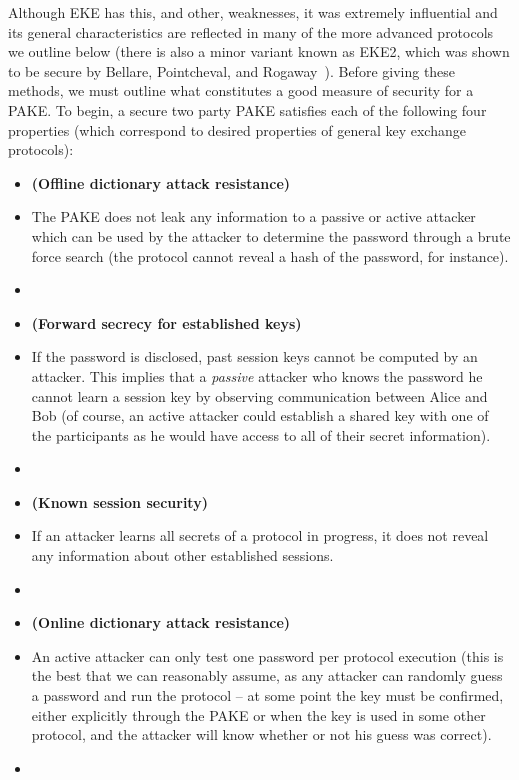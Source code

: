 \documentclass{amsart}
\theoremstyle{remark}
\begin{document}
Although EKE has this, and other, weaknesses, it was extremely influential and its general characteristics are 
reflected in many of the more advanced protocols we outline below (there is also a minor variant known as EKE2,
which was shown to be secure by Bellare, Pointcheval, and Rogaway~\cite{BePoRo00}).  Before giving these methods, we must outline 
what constitutes a good measure of security for a PAKE. To begin, a secure two party PAKE satisfies each of the following four properties
(which correspond to desired properties of general key exchange protocols):
\\

\begin{itemize}
 \item[] \textbf{(Offline dictionary attack resistance)}
 \item[] The PAKE does not leak any information to a passive or active attacker which can be 
 used by the attacker to determine the password through a brute force search (the protocol 
 cannot reveal a hash of the password, for instance).
 \item[]
 \item[] \textbf{(Forward secrecy for established keys)}
 \item[] If the password is disclosed, past session keys cannot be computed by an attacker.  
 This implies that a \emph{passive} attacker who knows the password he cannot learn a session 
 key by observing communication between Alice and Bob (of course, an active attacker could 
 establish a shared key with one of the participants as he would have access to all of their 
 secret information).
 \item[]
 \item[] \textbf{(Known session security)}
 \item[] If an attacker learns all secrets of a protocol in progress, it does not reveal 
 any information about other established sessions.
  \item[]
 \item[] \textbf{(Online dictionary attack resistance)}
 \item[] An active attacker can only test one password per protocol execution (this is the 
 best that we can reasonably assume, as any attacker can randomly guess a password and 
 run the protocol -- at some point the key must be confirmed, either explicitly through the 
 PAKE or when the key is used in some other protocol, and the attacker will know whether or
 not his guess was correct).
\item[]
\end{itemize}
\end{document}
